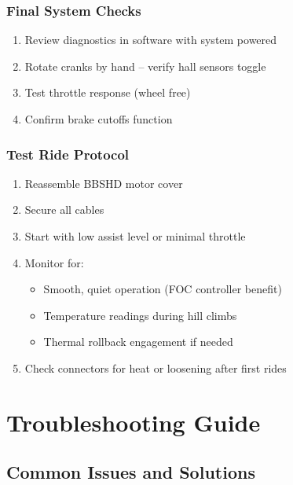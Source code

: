 \documentclass[11pt,a4paper]{article}
\begin{document}
\subsubsection{Final System Checks}
\begin{enumerate}
    \item Review diagnostics in software with system powered
    \item Rotate cranks by hand -- verify hall sensors toggle
    \item Test throttle response (wheel free)
    \item Confirm brake cutoffs function
\end{enumerate}

\subsubsection{Test Ride Protocol}
\begin{enumerate}
    \item Reassemble BBSHD motor cover
    \item Secure all cables
    \item Start with low assist level or minimal throttle
    \item Monitor for:
    \begin{itemize}
        \item Smooth, quiet operation (FOC controller benefit)
        \item Temperature readings during hill climbs
        \item Thermal rollback engagement if needed
    \end{itemize}
    \item Check connectors for heat or loosening after first rides
\end{enumerate}

\section{Troubleshooting Guide}

\subsection{Common Issues and Solutions}
\end{document}
